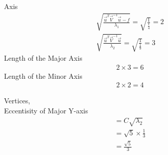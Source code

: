 \documentclass[journal,12pt,twocolumn]{IEEEtran}
\begin{document}
   Axis
   \begin{align}
       \sqrt{\frac{\vec{u}^T\vec{V}^{-1}\vec{u}-f}{\lambda_1}}=\sqrt{\frac{1}{\frac{1}{4}}}=2\\
       \sqrt{\frac{\vec{u}^T\vec{V}^{-1}\vec{u}}{\lambda_2}}=\sqrt{\frac{1}{\frac{1}{9}}}=3
   \end{align}
   Length of the Major Axis
   \begin{align}
       2\times3=6
   \end{align}
   Length of the Minor Axis
   \begin{align}
       2\times2=4
   \end{align}
   
  Vertices,
   \\
   Eccentisity of Major Y-axis
   \begin{align}
       = C\sqrt{\lambda_2}\\
       =\sqrt{5}\times\frac{1}{3}\\
       ={\frac{{\sqrt{5}}}{3}}
   \end{align}
  
\end{document}
